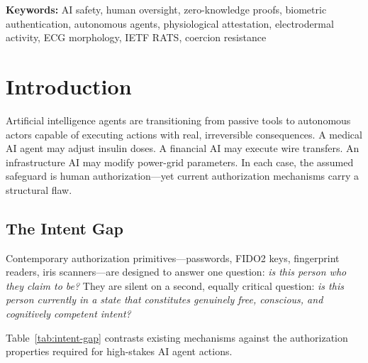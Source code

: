 \documentclass[12pt,a4paper]{article}
\begin{document}
\textbf{Keywords:} AI safety, human oversight, zero-knowledge proofs,
biometric authentication, autonomous agents, physiological attestation,
electrodermal activity, ECG morphology, IETF RATS, coercion resistance

\section{Introduction}

Artificial intelligence agents are transitioning from passive tools to
autonomous actors capable of executing actions with real, irreversible
consequences. A medical AI agent may adjust insulin doses. A financial AI may
execute wire transfers. An infrastructure AI may modify power-grid parameters.
In each case, the assumed safeguard is human authorization—yet current
authorization mechanisms carry a structural flaw.

\subsection{The Intent Gap}

Contemporary authorization primitives—passwords, FIDO2 keys, fingerprint
readers, iris scanners—are designed to answer one question: \textit{is this
person who they claim to be?} They are silent on a second, equally critical
question: \textit{is this person currently in a state that constitutes
genuinely free, conscious, and cognitively competent intent?}

Table~\ref{tab:intent-gap} contrasts existing mechanisms against the
authorization properties required for high-stakes AI agent actions.

\begin{table}[h]
\centering
\caption{Authorization properties of existing mechanisms vs.\ LICET v2.}
\label{tab:intent-gap}
\end{table}
\end{document}
